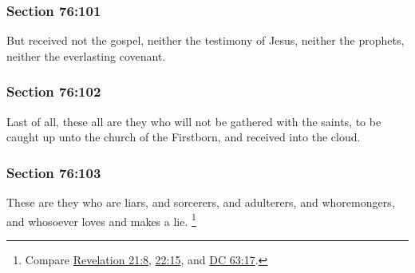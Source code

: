 	\subsubsection{Section 76:101} %
		\label{DC76-101}

		But received not the gospel, neither the testimony of Jesus, neither the prophets, neither the everlasting covenant.


	\subsubsection{Section 76:102} %
		\label{DC76-102}

		Last of all, these all are they who will not be gathered with the saints, to be caught up unto the church of the Firstborn, and received into the cloud.


	\subsubsection{Section 76:103} %
		\label{DC76-103}

		These are they who are liars, and sorcerers, and adulterers, and whoremongers, and whosoever loves and makes a lie.%
			\footnote{%
				Compare \hyperref[REVELATIONNT-21-8]{Revelation 21:8}, \hyperref[REVELATIONNT-22-15]{22:15}, and \hyperref[DC63-17]{DC 63:17}.
				}


